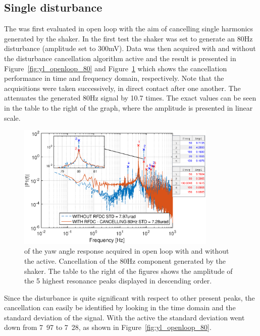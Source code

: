 \subsection{Single disturbance}
The \abbrRFDC was first evaluated in open loop with the aim of cancelling single harmonics generated by the shaker. In the first test the shaker was set to generate an 80Hz disturbance (amplitude set to 300mV). Data was then acquired with and without the disturbance cancellation algorithm active and the result is presented in Figure~\ref{fig:yl_openloop_80} and Figure~\ref{fig:fft_openloop_80} which shows the cancellation performance in time and frequency domain, respectively. Note that the acquisitions were taken successively, in direct contact after one another. The \abbrRFDC attenuates the generated 80Hz signal by 10.7 times. The exact values can be seen in the table to the right of the graph, where the amplitude is presented in linear scale.

\begin{figure}[h]
  \centering %
  \includegraphics[width=0.85\textwidth]{fig/matlab/fft_openloop_ext_disturbance_80Hz_with_zoom}
  \caption{\label{fig:fft_openloop_80} \abbrFFT of the yaw angle response acquired in open loop with and without the \abbrRFDC active. Cancellation of the 80Hz component generated by the shaker. The table to the right of the figures shows the amplitude of the 5 highest resonance peaks displayed in descending order.}
\end{figure}

Since the disturbance is quite significant with respect to other present peaks, the cancellation can easily be identified by looking in the time domain and the standard deviation of the signal. With the \abbrRFDC active the standard deviation went down from \unit{7.97}{\micro\radian} to \unit{7.28}{\micro\radian}, as shown in Figure~\ref{fig:yl_openloop_80}.

